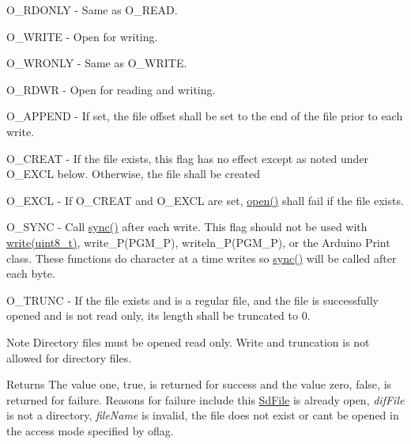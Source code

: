 O\+\_\+\+R\+D\+O\+N\+LY -\/ Same as O\+\_\+\+R\+E\+AD.

O\+\_\+\+W\+R\+I\+TE -\/ Open for writing.

O\+\_\+\+W\+R\+O\+N\+LY -\/ Same as O\+\_\+\+W\+R\+I\+TE.

O\+\_\+\+R\+D\+WR -\/ Open for reading and writing.

O\+\_\+\+A\+P\+P\+E\+ND -\/ If set, the file offset shall be set to the end of the file prior to each write.

O\+\_\+\+C\+R\+E\+AT -\/ If the file exists, this flag has no effect except as noted under O\+\_\+\+E\+X\+CL below. Otherwise, the file shall be created

O\+\_\+\+E\+X\+CL -\/ If O\+\_\+\+C\+R\+E\+AT and O\+\_\+\+E\+X\+CL are set, \hyperlink{class_sd_file_a9e211ac14784f48aebb213194336f8cc}{open()} shall fail if the file exists.

O\+\_\+\+S\+Y\+NC -\/ Call \hyperlink{class_sd_file_a742d64ca964583ac3a92b31f0eba5e14}{sync()} after each write. This flag should not be used with \hyperlink{class_sd_file_a67267a4b63d03a16e099195935613006}{write(uint8\+\_\+t)}, write\+\_\+\+P(\+P\+G\+M\+\_\+\+P), writeln\+\_\+\+P(\+P\+G\+M\+\_\+\+P), or the Arduino Print class. These functions do character at a time writes so \hyperlink{class_sd_file_a742d64ca964583ac3a92b31f0eba5e14}{sync()} will be called after each byte.

O\+\_\+\+T\+R\+U\+NC -\/ If the file exists and is a regular file, and the file is successfully opened and is not read only, its length shall be truncated to 0.

\begin{DoxyNote}{Note}
Directory files must be opened read only. Write and truncation is not allowed for directory files.
\end{DoxyNote}
\begin{DoxyReturn}{Returns}
The value one, true, is returned for success and the value zero, false, is returned for failure. Reasons for failure include this \hyperlink{class_sd_file}{Sd\+File} is already open, {\itshape dif\+File} is not a directory, {\itshape file\+Name} is invalid, the file does not exist or can\textquotesingle{}t be opened in the access mode specified by oflag. 
\end{DoxyReturn}
\mbox{\label{class_sd_file_afe1d8ce70ef58ee5967005047064167c}} 
